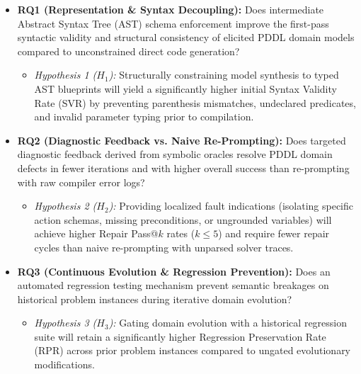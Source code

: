 \documentclass[10pt,a4paper]{article}
\begin{document}
\begin{itemize}[leftmargin=1.2em]
    \item \textbf{RQ1 (Representation \& Syntax Decoupling):} Does intermediate Abstract Syntax Tree (AST) schema enforcement improve the first-pass syntactic validity and structural consistency of elicited PDDL domain models compared to unconstrained direct code generation?
    \begin{itemize}
        \item \textit{Hypothesis 1 ($H_1$):} Structurally constraining model synthesis to typed AST blueprints will yield a significantly higher initial Syntax Validity Rate (SVR) by preventing parenthesis mismatches, undeclared predicates, and invalid parameter typing prior to compilation.
    \end{itemize}
    \item \textbf{RQ2 (Diagnostic Feedback vs. Naive Re-Prompting):} Does targeted diagnostic feedback derived from symbolic oracles resolve PDDL domain defects in fewer iterations and with higher overall success than re-prompting with raw compiler error logs?
    \begin{itemize}
        \item \textit{Hypothesis 2 ($H_2$):} Providing localized fault indications (isolating specific action schemas, missing preconditions, or ungrounded variables) will achieve higher Repair Pass@$k$ rates ($k \le 5$) and require fewer repair cycles than naive re-prompting with unparsed solver traces.
    \end{itemize}
    \item \textbf{RQ3 (Continuous Evolution \& Regression Prevention):} Does an automated regression testing mechanism prevent semantic breakages on historical problem instances during iterative domain evolution?
    \begin{itemize}
        \item \textit{Hypothesis 3 ($H_3$):} Gating domain evolution with a historical regression suite will retain a significantly higher Regression Preservation Rate (RPR) across prior problem instances compared to ungated evolutionary modifications.
    \end{itemize}
\end{itemize}

\end{document}
